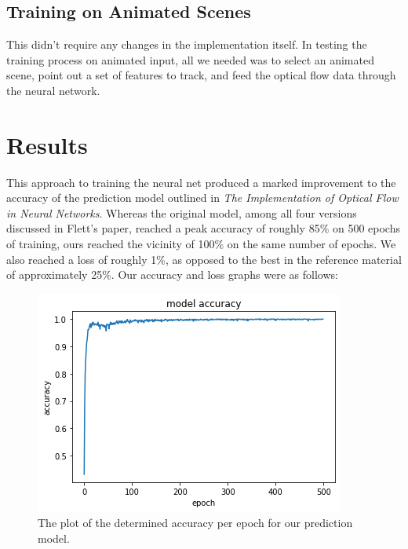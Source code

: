 \documentclass[]{article}
\begin{document}
\subsection{Training on Animated Scenes}\label{subsec:training-on-animated-scenes}
This didn't require any changes in the implementation itself.
In testing the training process on animated input, all we needed was to select an animated scene, point out a set of features to track, and feed the optical flow data through the neural network.

\section{Results}\label{sec:result}
This approach to training the neural net produced a marked improvement to the accuracy of the prediction model outlined in \textit{The Implementation of Optical Flow in Neural Networks}.\cite{flett}
Whereas the original model, among all four versions discussed in Flett's paper, reached a peak accuracy of roughly 85\% on 500 epochs of training, ours reached the vicinity of 100\% on the same number of epochs.
We also reached a loss of roughly 1\%, as opposed to the best in the reference material of approximately 25\%.
Our accuracy and loss graphs were as follows:

\begin{figure}[H]
    \centering
    \includegraphics[width=\textwidth]{output_23_0.png}
    \caption{The plot of the determined accuracy per epoch for our prediction model.}
    \label{fig:accuracy}
\end{figure}
\end{document}
